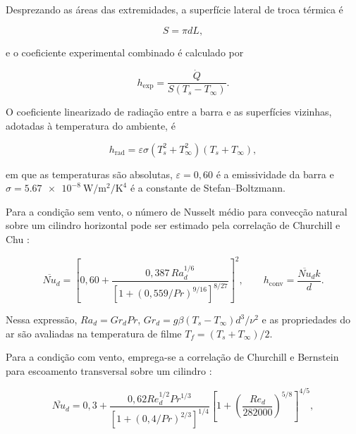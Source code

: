 \documentclass[11pt,a4paper]{article}
\begin{document}
Desprezando as áreas das extremidades, a superfície lateral de troca térmica é

\begin{equation}
  S = \pi d L,
  \label{eq:area}
\end{equation}

e o coeficiente experimental combinado é calculado por

\begin{equation}
  h_{\mathrm{exp}} =
  \frac{\dot Q}{S\left(T_s-T_\infty\right)}.
  \label{eq:hexp}
\end{equation}

O coeficiente linearizado de radiação entre a barra e as superfícies vizinhas, adotadas à temperatura do ambiente, é

\begin{equation}
  h_{\mathrm{rad}} = \varepsilon\sigma
  \left(T_s^2+T_\infty^2\right)
  \left(T_s+T_\infty\right),
  \label{eq:hrad}
\end{equation}

em que as temperaturas são absolutas, $\varepsilon=0{,}60$ é a emissividade da barra e $\sigma=\SI{5.67e-8}{\watt\per\square\metre\per\kelvin\tothe{4}}$ é a constante de Stefan--Boltzmann.

Para a condição sem vento, o número de Nusselt médio para convecção natural sobre um cilindro horizontal pode ser estimado pela correlação de Churchill e Chu \cite{incropera}:

\begin{equation}
  \overline{Nu}_d =
  \left[
  0{,}60+
  \frac{0{,}387\,Ra_d^{1/6}}
  {\left[1+\left(0{,}559/Pr\right)^{9/16}\right]^{8/27}}
  \right]^2,
  \qquad
  h_{\mathrm{conv}}=\frac{\overline{Nu}_d k}{d}.
  \label{eq:natural}
\end{equation}

Nessa expressão, $Ra_d=Gr_dPr$, $Gr_d=g\beta(T_s-T_\infty)d^3/\nu^2$ e as propriedades do ar são avaliadas na temperatura de filme $T_f=(T_s+T_\infty)/2$.

Para a condição com vento, emprega-se a correlação de Churchill e Bernstein para escoamento transversal sobre um cilindro \cite{incropera}:

\begin{equation}
  \overline{Nu}_d = 0{,}3+
  \frac{0{,}62Re_d^{1/2}Pr^{1/3}}
  {\left[1+(0{,}4/Pr)^{2/3}\right]^{1/4}}
  \left[1+\left(\frac{Re_d}{282000}\right)^{5/8}\right]^{4/5},
  \label{eq:forcada}
\end{equation}
\end{document}

